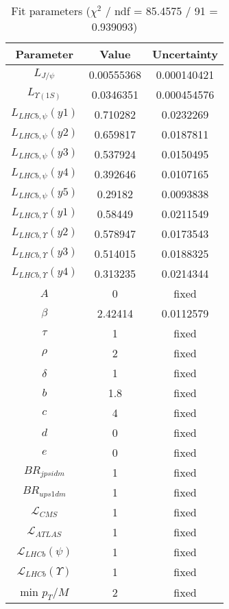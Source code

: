 \begin{table}
\centering
\begin{tabular}{c|c|c}
Parameter & Value & Uncertainty \\
\hline
$L_{J/\psi}$ & 0.00555368 & 0.000140421 \\
$L_{\Upsilon(1S)}$ & 0.0346351 & 0.000454576 \\
$L_{LHCb,\psi}(y1)$ & 0.710282 & 0.0232269 \\
$L_{LHCb,\psi}(y2)$ & 0.659817 & 0.0187811 \\
$L_{LHCb,\psi}(y3)$ & 0.537924 & 0.0150495 \\
$L_{LHCb,\psi}(y4)$ & 0.392646 & 0.0107165 \\
$L_{LHCb,\psi}(y5)$ & 0.29182 & 0.0093838 \\
$L_{LHCb,\Upsilon}(y1)$ & 0.58449 & 0.0211549 \\
$L_{LHCb,\Upsilon}(y2)$ & 0.578947 & 0.0173543 \\
$L_{LHCb,\Upsilon}(y3)$ & 0.514015 & 0.0188325 \\
$L_{LHCb,\Upsilon}(y4)$ & 0.313235 & 0.0214344 \\
$A$ & 0 & fixed \\
$\beta$ & 2.42414 & 0.0112579 \\
$\tau$ & 1 & fixed \\
$\rho$ & 2 & fixed \\
$\delta$ & 1 & fixed \\
$b$ & 1.8 & fixed \\
$c$ & 4 & fixed \\
$d$ & 0 & fixed \\
$e$ & 0 & fixed \\
$BR_{jpsidm}$ & 1 & fixed \\
$BR_{ups1dm}$ & 1 & fixed \\
$\mathcal L_{CMS}$ & 1 & fixed \\
$\mathcal L_{ATLAS}$ & 1 & fixed \\
$\mathcal L_{LHCb}(\psi)$ & 1 & fixed \\
$\mathcal L_{LHCb}(\Upsilon)$ & 1 & fixed \\
min $p_T/M$ & 2 & fixed \\
\end{tabular}
\caption{Fit parameters ($\chi^2$ / ndf = 85.4575 / 91 = 0.939093)}
\end{table}
